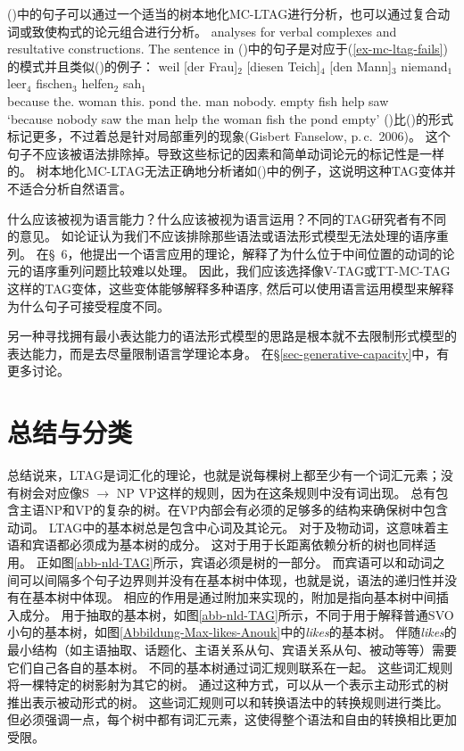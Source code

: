 ()中的句子可以通过一个适当的树本地化MC-LTAG进行分析，也可以通过复合动词或致使构式的论元组合进行分析。
analyses for verbal complexes and resultative constructions. The sentence in 
()中的句子是对应于(\ref{ex-mc-ltag-fails})的模式并且类似()的例子：
\ea
\gll weil [der Frau]$_2$ [diesen Teich]$_4$ [den Mann]$_3$ niemand$_1$ leer$_4$ fischen$_3$ helfen$_2$ sah$_1$\\
	 because \spacebr{}the.\dat{} woman \spacebr{}this.\acc{} pond \spacebr{}the.\acc{} man nobody.\nom{} empty fish help saw\\
\glt `because nobody saw the man help the woman fish the pond empty'
\z
()比()的形式标记更多，不过着总是针对局部重列的现象(Gisbert Fanselow, p.\,c.\ 2006)。
这个句子不应该被语法排除掉。导致这些标记的因素和简单动词论元的标记性是一样的。
树本地化MC-LTAG无法正确地分析诸如()中的例子，这说明这种TAG变体并不适合分析自然语言。

什么应该被视为语言能力？什么应该被视为语言运用？不同的TAG研究者有不同的意见。
如\citet[]{Rambow94a}论证认为我们不应该排除那些语法或语法形式模型无法处理的语序重列。
在\S~6，他提出一个语言应用的理论，解释了为什么位于中间位置的动词的论元的语序重列问题比较难以处理。
因此，我们应该选择像V-TAG或TT-MC-TAG这样的TAG变体\citep{Lichte2007a}，这些变体能够解释多种语序,
然后可以使用语言运用模型来解释为什么句子可接受程度不同。

另一种寻找拥有最小表达能力的语法形式模型的思路是根本就不去限制形式模型的表达能力，而是去尽量限制语言学理论本身。
在\S \ref{sec-generative-capacity}中，有更多讨论。

\section{总结与分类}

总结说来，LTAG是词汇化的理论，也就是说每棵树上都至少有一个词汇元素；没有树会对应像S $\to$ NP VP这样的规则，因为在这条规则中没有词出现。
总有包含主语NP和VP的复杂的树。在VP内部会有必须的足够多的结构来确保树中包含动词。
LTAG中的基本树总是包含中心词及其论元。
对于及物动词，这意味着主语和宾语都必须成为基本树的成分。
这对于用于长距离依赖分析的树也同样适用。
正如图\ref{abb-nld-TAG}所示，宾语必须是树的一部分。
而宾语可以和动词之间可以间隔多个句子边界则并没有在基本树中体现，也就是说，语法的递归性并没有在基本树中体现。
相应的作用是通过附加来实现的，附加是指向基本树中间插入成分。
用于抽取的基本树，如图\ref{abb-nld-TAG}所示，不同于用于解释普通SVO小句的基本树，如图\ref{Abbildung-Max-likes-Anouk}中的\emph{likes}的基本树。 
伴随\emph{likes}的最小结构（如主语抽取、话题化、主语关系从句、宾语关系从句、被动等等）需要它们自己各自的基本树\citep[]{KJ2003a}。
不同的基本树通过词汇规则联系在一起。
这些词汇规则将一棵特定的树影射为其它的树。
通过这种方式，可以从一个表示主动形式的树推出表示被动形式的树。
这些词汇规则可以和转换语法中的转换规则进行类比。 
但必须强调一点，每个树中都有词汇元素，这使得整个语法和自由的转换相比更加受限。

